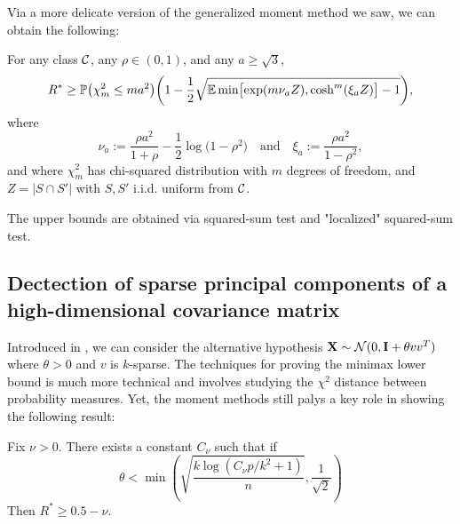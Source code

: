 \documentclass[10pt, oneside]{article}
\begin{document}
Via a more delicate version of the generalized moment method we saw, we can obtain the following:
\begin{prop}
  For any class ${\mathcal C}$, any $\rho\in(0, 1)$, and any $a \ge\sqrt{3}$,
  \begin{equation}
  \label{lower} R^* \geq\mathbb{P} \bigl(\chi_m^2 \le m
  a^2 \bigr) \biggl(1 - \frac{1}2 \sqrt{\mathbb{E}\min \bigl[\exp (m
  \nu_a Z ), \cosh^m(\xi_a Z) \bigr] - 1}
  \biggr),
  \end{equation}
  where
  \[
  \nu_a := \frac{\rho a^2}{1+\rho} - \frac{1}2 \log\bigl(1-
  \rho^2\bigr)\quad  \mbox{and}\quad  \xi_a := \frac{\rho a^2}{1-\rho^2},
  \]
  and where $\chi_m^2$ has chi-squared distribution with $m$ degrees of
  freedom, and $Z=|S \cap S'|$ with $S, S'$ i.i.d. uniform from ${\mathcal C}$.
\end{prop}
The upper bounds are obtained via squared-sum test and "localized" squared-sum test. 

\subsection{Dectection of sparse principal components of a high-dimensional covariance matrix}
Introduced in \cite{berthet2013optimal}, we can consider the alternative hypothesis $\mathbf{X} \sim {\mathcal N}(0, \mathbf{I} + \theta v v^T)$ where $\theta >0$ and $v$ is $k$-sparse. The techniques for proving the minimax lower bound is much more technical and involves studying the $\chi^2$ distance between probability measures. Yet, the moment methods still palys a key role in showing the following result:
\begin{prop}
  Fix $\nu > 0$. There exists a constant $C_{\nu}$ such that if 
  $$\theta < \min(\sqrt{\frac{k \log(C_{\nu}p/k^2 + 1)}{n}}, \frac{1}{\sqrt{2}})$$
  Then
  $R^* \ge 0.5 - \nu$.
\end{prop}




\end{document}
